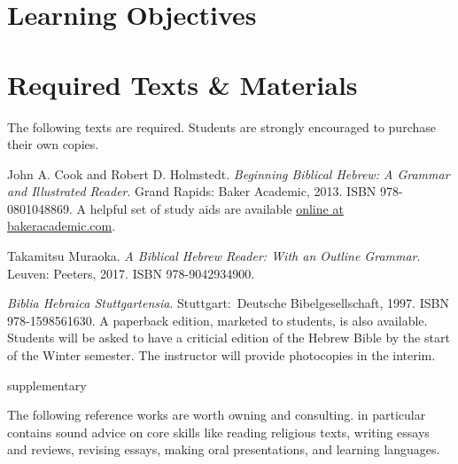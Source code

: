 \documentclass[titlepage]{article}
\newcommand\incl{../includes}
\begin{document}


  \section{Learning Objectives}
  \label{objectives}

  \edobject

\section{Required Texts \& Materials}
\label{texts}

The following texts are required. Students are strongly encouraged to
purchase their own copies.

\begingroup
\renewcommand{\section}[2]{}%
\begin{thebibliography}{BBH}%

    John A. Cook and Robert D. Holmstedt.
    \emph{Beginning Biblical Hebrew: A Grammar and Illustrated Reader}.
    Grand Rapids: Baker Academic, 2013. ISBN 978-0801048869. A helpful
    set of study aids are available \href{http://www.bakerpublishinggroup.com/books/beginning-biblical-hebrew/5629/students/esources}{online at bakeracademic.com}.

    Takamitsu Muraoka.
    \emph{A Biblical Hebrew Reader: With an Outline Grammar}.
    Leuven: Peeters, 2017. ISBN 978-9042934900.

    \emph{Biblia Hebraica Stuttgartensia}.
    Stuttgart: Deutsche Bibel\-ge\-sell\-schaft, 1997. ISBN 978-1598561630.
    A paperback edition, marketed to students, is also available.
    Students will be asked to have a criticial edition of the Hebrew
    Bible by the start of the Winter semester. The instructor will
    provide photocopies in the interim.

\end{thebibliography}
\endgroup

\section{Supplementary Texts}
\label{supplementary}

The following reference works are worth owning and consulting.
\cite{rlgs} in particular contains sound advice on core skills like
reading religious texts, writing essays and reviews, revising essays,
making oral presentations, and learning languages.
\end{document}
